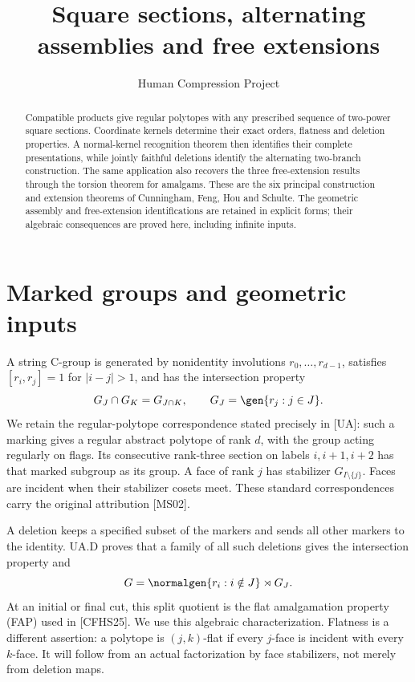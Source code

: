 
\title{Square sections, alternating assemblies and free extensions}
\author{Human Compression Project}
\date{}

\maketitle
\begin{abstract}
Compatible products give regular polytopes with any prescribed sequence of
two-power square sections. Coordinate kernels determine their exact orders,
flatness and deletion properties. A normal-kernel recognition theorem then
identifies their complete presentations, while jointly faithful deletions
identify the alternating two-branch construction. The same application also
recovers the three free-extension results through the torsion theorem for
amalgams. These are the six principal construction and extension theorems of
Cunningham, Feng, Hou and Schulte. The geometric assembly and free-extension
identifications are retained in explicit forms; their algebraic consequences
are proved here, including infinite inputs.
\end{abstract}

\section{Marked groups and geometric inputs}
A string C-group is generated by nonidentity involutions
$r_0,\ldots,r_{d-1}$, satisfies $[r_i,r_j]=1$ for $|i-j|>1$, and has
the intersection property
\[
 G_J\cap G_K=G_{J\cap K},\qquad G_J=\gen{r_j:j\in J}.
\]
We retain the regular-polytope correspondence stated precisely in [UA]:
such a marking gives a regular abstract polytope of rank $d$, with the
group acting regularly on flags. Its consecutive rank-three section on
labels $i,i+1,i+2$ has that marked subgroup as its group. A face of rank $j$
has stabilizer $G_{I\setminus\{j\}}$. Faces are incident when their
stabilizer cosets meet. These standard correspondences carry the original
attribution [MS02].

A deletion keeps a specified subset of the markers and sends all other
markers to the identity. UA.D proves that a family of all such deletions
gives the intersection property and
\[
 G=\normalgen{r_i:i\notin J}\rtimes G_J.
\]
At an initial or final cut, this split quotient is the flat amalgamation
property (FAP) used in [CFHS25]. We use this algebraic characterization.
Flatness is a different assertion: a polytope is $(j,k)$-flat if every
$j$-face is incident with every $k$-face. It will follow from an actual
factorization by face stabilizers, not merely from deletion maps.

